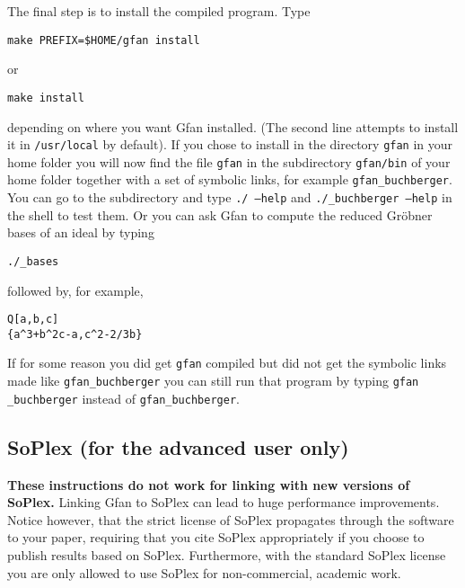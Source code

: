 The final step is to install the compiled program. Type
\color{red}
\begin{verbatim}
make PREFIX=$HOME/gfan install
\end{verbatim}
\color{black}or
\begin{verbatim}
make install
\end{verbatim}
depending on where you want Gfan installed. (The second line attempts to install it in {\tt /usr/local} by default). If you chose to install in
the directory {\tt gfan} in your home folder \color{red}you will now find the
file {\tt gfan} in the subdirectory {\tt gfan/bin} of your home folder together with a set of symbolic links\color{black},
for example {\tt gfan\_buchberger}.
You can go to the subdirectory and type {\tt ./\exename{} --help} and {\tt ./\exename{}\_buchberger --help} in
the shell to test them. Or you can ask Gfan to compute the reduced Gr\"obner bases of an ideal by typing
\begin{alltt}
./\exename{}\_bases
\end{alltt}
followed by, for example,
\begin{verbatim}
Q[a,b,c]
{a^3+b^2c-a,c^2-2/3b}
\end{verbatim}
\begin{remark}
If for some reason you did get {\tt gfan} compiled but did not get the symbolic links made like {\tt gfan\_buchberger} you can still run that program by typing {\tt gfan \_buchberger} instead of {\tt gfan\_buchberger}.
\end{remark}


\subsection{SoPlex (for the advanced user only)}
\label{subsec:soplex}
{\bf These instructions do not work for linking with new versions of SoPlex.}
Linking Gfan to SoPlex can lead to huge performance
improvements. Notice however, that the strict license of SoPlex
propagates through the software to your paper, requiring that you cite
SoPlex appropriately if you choose to publish results based on SoPlex.
Furthermore, with the standard SoPlex license you are only allowed to
use SoPlex for non-commercial, academic work.

